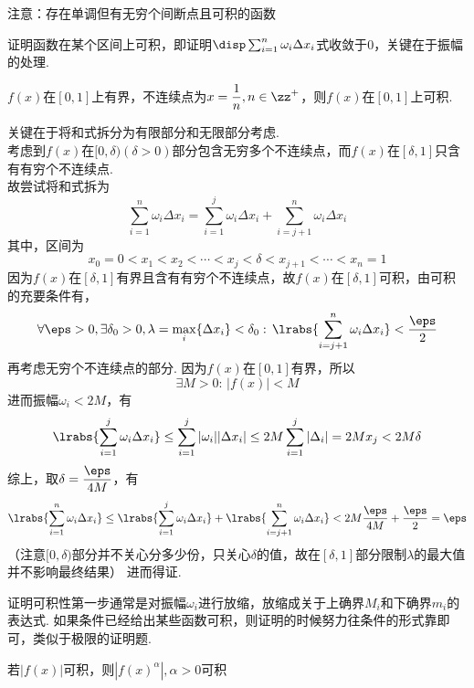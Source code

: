 \par 注意：存在单调但有无穷个间断点且可积的函数
\par 证明函数在某个区间上可积，即证明$\disp\sum_{i=1}^n\omega_i\Delta x_i$式收敛于$0$，关键在于振幅的处理.
\begin{example}
$f(x)$在$[0,1]$上有界，不连续点为$x=\dfrac{1}{n},n\in\zz^+$，则$f(x)$在$[0,1]$上可积.
\end{example}
\begin{analysis}
关键在于将和式拆分为有限部分和无限部分考虑.\\
考虑到$f(x)$在$[0,\delta)(\delta>0)$部分包含无穷多个不连续点，而$f(x)$在$[\delta,1]$只含有有穷个不连续点.\\
故尝试将和式拆为
\[\sum_{i=1}^n\omega_i\Delta x_i=\sum_{i=1}^j\omega_i\Delta x_i+\sum_{i=j+1}^n\omega_i\Delta x_i\]
其中，区间为
\[x_0=0<x_1<x_2<\cdots<x_j<\delta<x_{j+1}<\cdots<x_n=1\]
因为$f(x)$在$[\delta,1]$有界且含有有穷个不连续点，故$f(x)$在$[\delta,1]$可积，由可积的充要条件有，
\[\forall\eps>0,\exists\delta_0>0,\lambda=\max_i\{\Delta x_i\}<\delta_0:\,\lrabs{\sum_{i=j+1}^n\omega_i\Delta x_i}<\dfrac{\eps}{2}\]
再考虑无穷个不连续点的部分. 因为$f(x)$在$[0,1]$有界，所以
\[\exists M>0:\,|f(x)|<M\]
进而振幅$\omega_i<2M$，有
\[\lrabs{\sum_{i=1}^j\omega_i\Delta x_i}\leq\sum_{i=1}^j|\omega_i||\Delta x_i|\leq 2M\sum_{i=1}^j|\Delta_i|=2Mx_j<2M\delta\]
综上，取$\delta=\dfrac{\eps}{4M}$，有
\[\lrabs{\sum_{i=1}^n\omega_i\Delta x_i}\leq\lrabs{\sum_{i=1}^j\omega_i\Delta x_i}+\lrabs{\sum_{i=j+1}^n\omega_i\Delta x_i}<2M\dfrac{\eps}{4M}+\dfrac{\eps}{2}=\eps\]
（注意$[0,\delta)$部分并不关心分多少份，只关心$\delta$的值，故在$[\delta,1]$部分限制$\lambda$的最大值并不影响最终结果）
进而得证.
\end{analysis}
\par 证明可积性第一步通常是对振幅$\omega_i$进行放缩，放缩成关于上确界$M_i$和下确界$m_i$的表达式.
如果条件已经给出某些函数可积，则证明的时候努力往条件的形式靠即可，类似于极限的证明题.
\begin{example}
\label{ex:f_f2_absf_relation_lemma}
若$|f(x)|$可积，则$|f(x)^\alpha|,\alpha>0$可积
\end{example}
